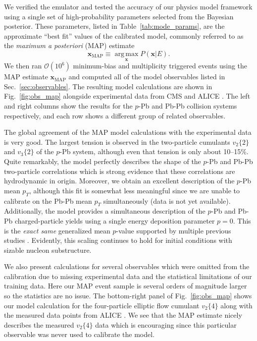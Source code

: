 \documentclass[aps,prc,reprint,amsmath,nofootinbib]{revtex4-1}
\newcommand{\vnk}[2]{v_#1\{#2\}}
\newcommand{\xv}{\mathbf x}
\newcommand{\order}[1]{$\mathcal O(10^{#1})$}
\begin{document}
We verified the emulator and tested the accuracy of our physics model framework using a single set of high-probability parameters selected from the Bayesian posterior.
These parameters, listed in Table~\ref{tab:mode_params}, are the approximate ``best fit'' values of the calibrated model, commonly referred to as the \emph{maximum a posteriori} (MAP) estimate
\begin{equation}
  \xv_\mathrm{MAP} \equiv \operatorname*{arg\, max}_{\xv} P(\xv | E).
\end{equation}
We then ran \order{6} minimum-bias and multiplicity triggered events using the MAP estimate $\xv_\mathrm{MAP}$ and computed all of the model observables listed in Sec.~\ref{sec:observables}.
The resulting model calculations are shown in Fig.~\ref{fig:obs_map} alongside experimental data from CMS \cite{Chatrchyan:2013nka} and ALICE \cite{Adam:2015ptt, Adam:2016izf, Adam:2014qja, Abelev:2013bla}.
The left and right columns show the results for the $p$-Pb and Pb-Pb collision systems respectively, and each row shows a different group of related observables.

The global agreement of the MAP model calculations with the experimental data is very good.
The largest tension is observed in the two-particle cumulants $\vnk{2}{2}$ and $\vnk{3}{2}$ of the $p$-Pb system, although even that tension is only about 10--15\%.
Quite remarkably, the model perfectly describes the shape of the $p$-Pb and Pb-Pb two-particle correlations which is strong evidence that these correlations are hydrodynamic in origin.
Moreover, we obtain an excellent description of the \mbox{$p$-Pb} mean $p_T$, although this fit is somewhat less meaningful since we are unable to calibrate on the Pb-Pb mean $p_T$ simultaneously (data is not yet available).
Additionally, the model provides a simultaneous description of the \mbox{$p$-Pb} and Pb-Pb charged-particle yields using a single energy deposition parameter $p=0$.
This is the \emph{exact same} generalized mean $p$-value supported by multiple previous studies \cite{Moreland:2014oya, Bernhard:2016tnd, Ke:2016jrd, Bernhard:2018hnz}.
Evidently, this scaling continues to hold for initial conditions with sizable nucleon substructure.

We also present calculations for several observables which were omitted from the calibration due to missing experimental data and the statistical limitations of our training data.
Here our MAP event sample is several orders of magnitude larger so the statistics are no issue.
The bottom-right panel of Fig.~\ref{fig:obs_map} shows our model calculation for the four-particle elliptic flow cumulant $\vnk{2}{4}$ along with the measured data points from \mbox{ALICE} \cite{Adam:2016izf}.
We see that the MAP estimate nicely describes the measured $\vnk{2}{4}$ data which is encouraging since this particular observable was never used to calibrate the model.
\end{document}
